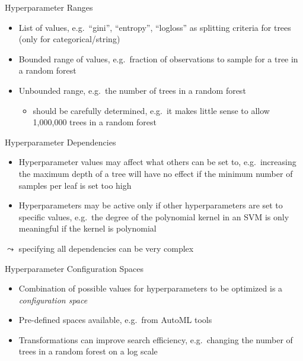 \documentclass[main]{subfiles}
\begin{document}
\begin{frame}{Hyperparameter Ranges}
    \begin{itemize}
        \item List of values, e.g.\ ``gini'', ``entropy'', ``logloss'' as splitting criteria for trees (only for categorical/string)
        \item Bounded range of values, e.g.\ fraction of observations to sample for a tree in a random forest
        \item Unbounded range, e.g.\ the number of trees in a random forest
        \begin{itemize}
            \item[$\leadsto$] should be carefully determined, e.g.\ it makes little sense to allow 1,000,000 trees in a random forest
        \end{itemize}
    \end{itemize}
    
\end{frame}


\begin{frame}{Hyperparameter Dependencies}
    \begin{itemize}
        \item Hyperparameter values may affect what others can be set to, e.g.\ increasing the maximum depth of a tree will have no effect if the minimum number of samples per leaf is set too high
        \item Hyperparameters may be active only if other hyperparameters are set to specific values, e.g.\ the degree of the polynomial kernel in an SVM is only meaningful if the kernel is polynomial
    \end{itemize}
    $\leadsto$ specifying all dependencies can be very complex
\end{frame}


\begin{frame}{Hyperparameter Configuration Spaces}
    \begin{itemize}
        \item Combination of possible values for hyperparameters to be optimized is a \emph{configuration space}
        \item Pre-defined spaces available, e.g.\ from AutoML tools
        \item Transformations can improve search efficiency, e.g.\ changing the number of trees in a random forest on a log scale
    \end{itemize}
\end{frame}
\end{document}
